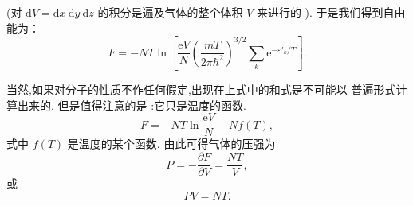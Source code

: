 \documentclass[12pt]{article}
\begin{document}
(对 $\mathrm{d} V=\mathrm{d} x \mathrm{~d} y \mathrm{~d} z$ 的积分是遍及气体的整个体积 $V$ 来进行的 ). 于是我们得到自由能为：
\begin{equation}
	F=-N T \ln \left[\frac{\mathrm{e} V}{N}\left(\frac{m T}{2 \pi \hbar^{2}}\right)^{3 / 2} \sum_{k} \mathrm{e}^{-\varepsilon{'}_{k}/ T}\right].
\end{equation}

当然,如果对分子的性质不作任何假定,出现在上式中的和式是不可能以 普遍形式计算出来的. 但是值得注意的是 :它只是温度的函数.
\begin{equation}
	F=-N T \ln \frac{\mathrm{e} V}{N}+N f(T),
\end{equation}
式中 $f(T)$ 是温度的某个函数. 由此可得气体的压强为
\begin{equation}
	P=-\frac{\partial F}{\partial V}=\frac{N T}{V},
\end{equation}
或
\begin{equation}
	P V=N T.
\end{equation}








\end{document}
